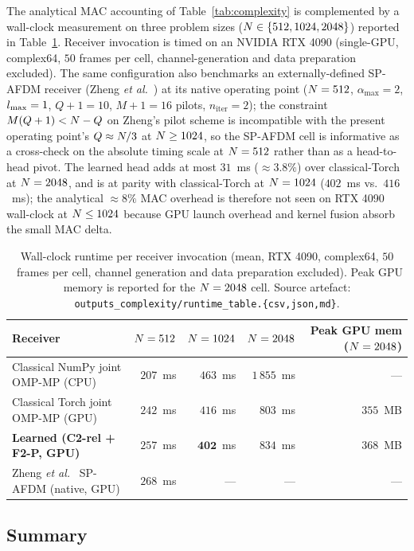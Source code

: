 The analytical MAC accounting of Table~\ref{tab:complexity} is complemented by a wall-clock measurement on three problem sizes ($N \in \{512, 1024, 2048\}$) reported in Table~\ref{tab:runtime}. Receiver invocation is timed on an NVIDIA RTX 4090 (single-GPU, complex64, $50$ frames per cell, channel-generation and data preparation excluded). The same configuration also benchmarks an externally-defined SP-AFDM receiver (Zheng \emph{et al.}~\cite{qing2024spafdm}) at its native operating point ($N = 512$, $\alpha_\text{max} = 2$, $l_{\max} = 1$, $Q + 1 = 10$, $M + 1 = 16$ pilots, $n_\text{iter} = 2$); the constraint $M(Q+1) < N - Q$ on Zheng's pilot scheme is incompatible with the present operating point's $Q \approx N / 3$ at $N \geq 1024$, so the SP-AFDM cell is informative as a cross-check on the absolute timing scale at $N = 512$ rather than as a head-to-head pivot. The learned head adds at most $31$~ms ($\approx 3.8\%$) over classical-Torch at $N = 2048$, and is at parity with classical-Torch at $N = 1024$ ($402$~ms vs.\ $416$~ms); the analytical $\approx 8\%$ MAC overhead is therefore not seen on RTX 4090 wall-clock at $N \leq 1024$ because GPU launch overhead and kernel fusion absorb the small MAC delta.

\begin{table}[t]
\centering
\caption{Wall-clock runtime per receiver invocation (mean, RTX 4090, complex64, $50$~frames per cell, channel generation and data preparation excluded). Peak GPU memory is reported for the $N = 2048$ cell. Source artefact: \texttt{outputs\_complexity/runtime\_table.\{csv,json,md\}}.}
\label{tab:runtime}
\small
\begin{tabular}{lrrrr}
\toprule
Receiver & $N = 512$ & $N = 1024$ & $N = 2048$ & Peak GPU mem ($N = 2048$) \\
\midrule
Classical NumPy joint OMP-MP (CPU) & $207$~ms & $463$~ms & $1\,855$~ms & --- \\
Classical Torch joint OMP-MP (GPU) & $242$~ms & $416$~ms & $\;\;\;803$~ms & $355$~MB \\
\textbf{Learned (C2-rel + F2-P, GPU)} & $257$~ms & $\mathbf{402}$~ms & $\;\;\;834$~ms & $368$~MB \\
Zheng \emph{et al.}~\cite{qing2024spafdm} SP-AFDM (native, GPU) & $268$~ms & --- & --- & --- \\
\bottomrule
\end{tabular}
\end{table}

\subsection{Summary}
\label{ssec:results_summary}

